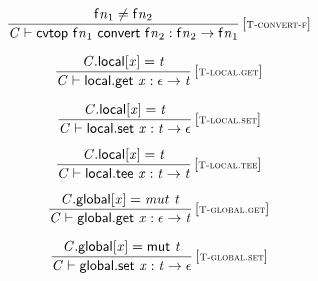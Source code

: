 $$
\begin{array}{@{}c@{}}\displaystyle
\frac{
{{\mathsf{f}}{{\mathit{n}}}}_{{1}} \neq {{\mathsf{f}}{{\mathit{n}}}}_{{2}}
}{
{\mathit{C}} \vdash \mathsf{cvtop}~{{\mathsf{f}}{{\mathit{n}}}}_{{1}}~\mathsf{convert}~{{\mathsf{f}}{{\mathit{n}}}}_{{2}} : {{\mathsf{f}}{{\mathit{n}}}}_{{2}} \rightarrow {{\mathsf{f}}{{\mathit{n}}}}_{{1}}
} \, {[\textsc{\scriptsize T{-}convert{-}f}]}
\qquad
\end{array}
$$

\vspace{1ex}

$$
\begin{array}{@{}c@{}}\displaystyle
\frac{
{\mathit{C}}.\mathsf{local}[{\mathit{x}}] = {\mathit{t}}
}{
{\mathit{C}} \vdash \mathsf{local.get}~{\mathit{x}} : \epsilon \rightarrow {\mathit{t}}
} \, {[\textsc{\scriptsize T{-}local.get}]}
\qquad
\end{array}
$$

$$
\begin{array}{@{}c@{}}\displaystyle
\frac{
{\mathit{C}}.\mathsf{local}[{\mathit{x}}] = {\mathit{t}}
}{
{\mathit{C}} \vdash \mathsf{local.set}~{\mathit{x}} : {\mathit{t}} \rightarrow \epsilon
} \, {[\textsc{\scriptsize T{-}local.set}]}
\qquad
\end{array}
$$

$$
\begin{array}{@{}c@{}}\displaystyle
\frac{
{\mathit{C}}.\mathsf{local}[{\mathit{x}}] = {\mathit{t}}
}{
{\mathit{C}} \vdash \mathsf{local.tee}~{\mathit{x}} : {\mathit{t}} \rightarrow {\mathit{t}}
} \, {[\textsc{\scriptsize T{-}local.tee}]}
\qquad
\end{array}
$$

\vspace{1ex}

$$
\begin{array}{@{}c@{}}\displaystyle
\frac{
{\mathit{C}}.\mathsf{global}[{\mathit{x}}] = {\mathit{mut}}~{\mathit{t}}
}{
{\mathit{C}} \vdash \mathsf{global.get}~{\mathit{x}} : \epsilon \rightarrow {\mathit{t}}
} \, {[\textsc{\scriptsize T{-}global.get}]}
\qquad
\end{array}
$$

$$
\begin{array}{@{}c@{}}\displaystyle
\frac{
{\mathit{C}}.\mathsf{global}[{\mathit{x}}] = \mathsf{mut}~{\mathit{t}}
}{
{\mathit{C}} \vdash \mathsf{global.set}~{\mathit{x}} : {\mathit{t}} \rightarrow \epsilon
} \, {[\textsc{\scriptsize T{-}global.set}]}
\qquad
\end{array}
$$

